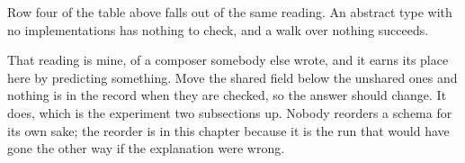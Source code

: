 %
Row four of the table above falls out of the same reading. An abstract type
with no implementations has nothing to check, and a walk over nothing succeeds.

%
That reading is mine, of a composer somebody else wrote, and it earns its place
here by predicting something. Move the shared field below the unshared ones and
nothing is in the record when they are checked, so the answer should change.
It does, which is the experiment two subsections up. Nobody reorders a schema
for its own sake; the reorder is in this chapter because it is the run that
would have gone the other way if the explanation were wrong.
%
